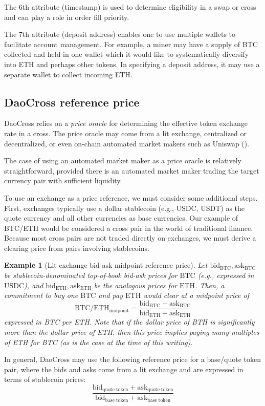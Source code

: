 \documentclass[11pt, reqno]{amsart}
\newtheorem{example}[thm]{Example}
\newcommand{\bidbtc}{\mathrm{bid}_\mathrm{BTC}}
\newcommand{\askbtc}{\mathrm{ask}_\mathrm{BTC}}
\newcommand{\bideth}{\mathrm{bid}_\mathrm{ETH}}
\newcommand{\asketh}{\mathrm{ask}_\mathrm{ETH}}
\newcommand{\bidbase}{\mathrm{bid}_\mathrm{quote\;token}}
\newcommand{\askbase}{\mathrm{ask}_\mathrm{quote\;token}}
\newcommand{\bidquote}{\mathrm{bid}_\mathrm{base\;token}}
\newcommand{\askquote}{\mathrm{ask}_\mathrm{base\;token}}
\newcommand{\BTC}{\mathrm{BTC}}
\newcommand{\ETH}{\mathrm{ETH}}
\newcommand{\USDC}{\mathrm{USDC}}
\newcommand{\midpoint}{\mathrm{midpoint}}
\begin{document}
The 6th attribute
(timestamp) is used to determine eligibility in a swap or cross and can play a
role in order fill priority.

The 7th attribute (deposit address) enables one to
use multiple wallets to facilitate account management. For example, a miner
may have a supply of BTC collected and held in one wallet which it would like
to systematically diversify into ETH and perhaps other tokens. In specifying
a deposit address, it may use a separate wallet to collect incoming ETH.

\subsection{DaoCross reference price}

DaoCross relies on a \emph{price oracle} for determining the effective
token exchange rate in a cross. The price oracle may come from a lit
exchange, centralized or decentralized, or even on-chain automated market
makers such as Uniswap (\cite[\S 2.2]{AdZiRo20}).

The case of using an automated market maker as a price oracle is relatively
straightforward, provided there is an automated market maker trading the
target currency pair with sufficient liquidity.

To use an exchange as a price reference, we must consider some additional
steps. First, exchanges typically use a dollar stablecoin (e.g., USDC, USDT) as
the quote currency and all other currencies as base currencies. Our example
of BTC/ETH would be considered a cross pair in the world of traditional
finance. Because most cross pairs are not traded directly on exchanges, we
must derive a clearing price from pairs involving stablecoins.

\begin{example}[Lit exchange bid-ask midpoint reference price]
Let $\bidbtc, \askbtc$ be stablecoin-denominated top-of-book bid-ask prices
for $\BTC$ (e.g., expressed in $\USDC$), and $\bideth, \asketh$ be the analogous
prices for $\ETH$. Then, a commitment to buy one $\BTC$ and pay $\ETH$ would
clear at a midpoint price of
\[
    \BTC/\ETH_{\midpoint} = \frac{\bidbtc + \askbtc}{\bideth + \asketh}
\]
expressed in BTC per ETH. Note that if the dollar price of BTH is significantly
more than the dollar price of ETH, then this price implies paying many
multiples of ETH for BTC (as is the case at the time of this writing).
\end{example}

In general, DaoCross may use the following reference price for a base/quote
token pair, where the bids and asks come from a lit exchange and are expressed
in terms of stablecoin prices:
\begin{equation}
    \frac{\bidbase + \askbase}{\bidquote + \askquote}
\end{equation}
\end{document}
